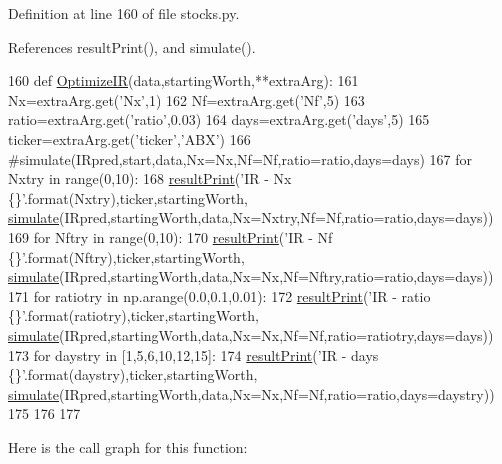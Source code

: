 Definition at line 160 of file stocks.\+py.



References result\+Print(), and simulate().


\begin{DoxyCode}
160 \textcolor{keyword}{def }\hyperlink{namespacestocks_a001673a0b7e5f0867197d97fea8a251b}{OptimizeIR}(data,startingWorth,**extraArg):
161     Nx=extraArg.get(\textcolor{stringliteral}{'Nx'},1)
162     Nf=extraArg.get(\textcolor{stringliteral}{'Nf'},5)
163     ratio=extraArg.get(\textcolor{stringliteral}{'ratio'},0.03)
164     days=extraArg.get(\textcolor{stringliteral}{'days'},5)
165     ticker=extraArg.get(\textcolor{stringliteral}{'ticker'},\textcolor{stringliteral}{'ABX'})
166     \textcolor{comment}{#simulate(IRpred,start,data,Nx=Nx,Nf=Nf,ratio=ratio,days=days)}
167     \textcolor{keywordflow}{for} Nxtry \textcolor{keywordflow}{in} range(0,10):
168         \hyperlink{namespacestocks_ac80b7d5d1cdc027b7a0e2e19093baf9b}{resultPrint}(\textcolor{stringliteral}{'IR - Nx \{\}'}.format(Nxtry),ticker,startingWorth,
      \hyperlink{namespacestocks_a6217dcad564ba6361c3cca44542ba220}{simulate}(IRpred,startingWorth,data,Nx=Nxtry,Nf=Nf,ratio=ratio,days=days))
169     \textcolor{keywordflow}{for} Nftry \textcolor{keywordflow}{in} range(0,10):
170         \hyperlink{namespacestocks_ac80b7d5d1cdc027b7a0e2e19093baf9b}{resultPrint}(\textcolor{stringliteral}{'IR - Nf \{\}'}.format(Nftry),ticker,startingWorth,
      \hyperlink{namespacestocks_a6217dcad564ba6361c3cca44542ba220}{simulate}(IRpred,startingWorth,data,Nx=Nx,Nf=Nftry,ratio=ratio,days=days))
171     \textcolor{keywordflow}{for} ratiotry \textcolor{keywordflow}{in} np.arange(0.0,0.1,0.01):
172         \hyperlink{namespacestocks_ac80b7d5d1cdc027b7a0e2e19093baf9b}{resultPrint}(\textcolor{stringliteral}{'IR - ratio \{\}'}.format(ratiotry),ticker,startingWorth,
      \hyperlink{namespacestocks_a6217dcad564ba6361c3cca44542ba220}{simulate}(IRpred,startingWorth,data,Nx=Nx,Nf=Nf,ratio=ratiotry,days=days))
173     \textcolor{keywordflow}{for} daystry \textcolor{keywordflow}{in} [1,5,6,10,12,15]:
174         \hyperlink{namespacestocks_ac80b7d5d1cdc027b7a0e2e19093baf9b}{resultPrint}(\textcolor{stringliteral}{'IR - days \{\}'}.format(daystry),ticker,startingWorth,
      \hyperlink{namespacestocks_a6217dcad564ba6361c3cca44542ba220}{simulate}(IRpred,startingWorth,data,Nx=Nx,Nf=Nf,ratio=ratio,days=daystry))
175 
176 
177 
\end{DoxyCode}
Here is the call graph for this function\+:\nopagebreak
